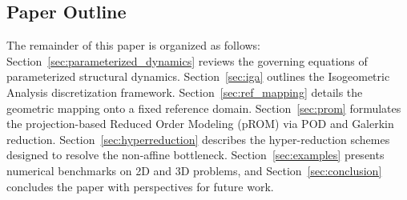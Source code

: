 \subsection{Paper Outline}
The remainder of this paper is organized as follows: 
Section~\ref{sec:parameterized_dynamics} reviews the governing equations of parameterized structural dynamics. 
Section~\ref{sec:iga} outlines the Isogeometric Analysis discretization framework. 
Section~\ref{sec:ref_mapping} details the geometric mapping onto a fixed reference domain. 
Section~\ref{sec:prom} formulates the projection-based Reduced Order Modeling (pROM) via POD and Galerkin reduction. 
Section~\ref{sec:hyperreduction} describes the hyper-reduction schemes designed to resolve the non-affine bottleneck. 
Section~\ref{sec:examples} presents numerical benchmarks on 2D and 3D problems, and 
Section~\ref{sec:conclusion} concludes the paper with perspectives for future work.
